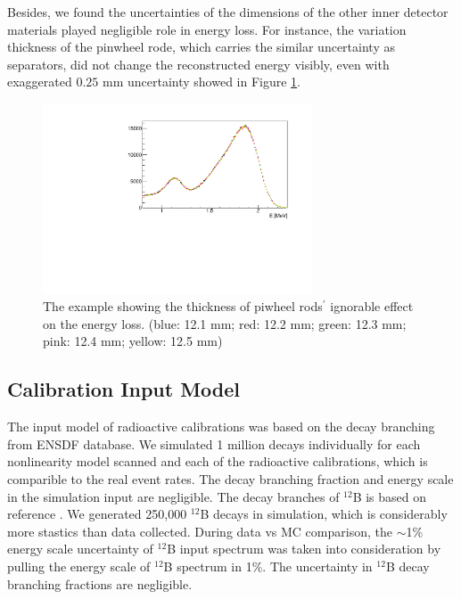 Besides, we found the uncertainties of the dimensions of the other inner detector materials played negligible role in energy loss. 
For instance, the variation thickness of the pinwheel rode, which carries the similar uncertainty as separators, did not change the reconstructed energy visibly, even with exaggerated $0.25$ mm uncertainty showed in Figure \ref{fig:pinwheelthick}.

\begin{figure}[h!]
\centering
\includegraphics[width=80mm]{figures/pinwheelthick.pdf}
\caption{The example showing the thickness of piwheel rods$^\prime$ ignorable effect on the energy loss. (blue: 12.1 mm; red: 12.2 mm; green: 12.3 mm; pink: 12.4 mm; yellow: 12.5 mm)}
\label{fig:pinwheelthick}
\end{figure}

\subsection{Calibration Input Model}
The input model of radioactive calibrations was based on the decay branching from ENSDF database.
We simulated 1 million decays individually for each nonlinearity model scanned and each of the radioactive calibrations, which is comparible to the real event rates.
The decay branching fraction and energy scale in the simulation input are negligible.
The decay branches of $^{12}$B is based on reference \cite{duke}. 
We generated 250,000 $^{12}$B decays in simulation, which is considerably more stastics than data collected.
During data vs MC comparison, the $\sim$1\% energy scale uncertainty of $^{12}$B input spectrum was taken into consideration by pulling the energy scale of $^{12}$B spectrum in 1\%. 
The uncertainty in $^{12}$B decay branching fractions are negligible.

